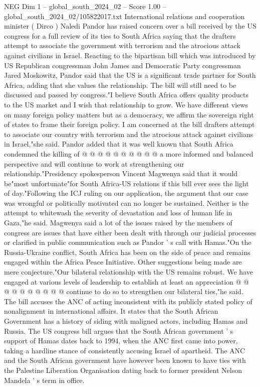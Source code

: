 \begin{textsample}{NEG Dim 1 – global\_south\_2024\_02 – Score 1.00 – global\_south\_2024\_02/105822017.txt}  \label{ex:f1_neg_423}
International relations and cooperation minister ( Dirco ) Naledi Pandor has raised concern over a bill received by the US congress for a full review of its ties to South Africa saying that the drafters attempt to associate the government with terrorism and the atrocious attack against civilians in Israel.
Reacting to the bipartisan bill which was introduced by US Republican congressman John James and Democratic Party congressman Jared Moskowitz, Pandor said that the US is a significant trade partner for South Africa, adding that she values the relationship.
The bill will still need to be discussed and passed by congress."I believe South Africa offers quality products to the US market and I wish that relationship to grow.
We have different views on many foreign policy matters but as a democracy, we affirm the sovereign right of states to frame their foreign policy.
I am concerned at the bill drafters attempt to associate our country with terrorism and the atrocious attack against civilians in Israel,"she said.
Pandor added that it was well known that South Africa condemned the killing of @ @ @ @ @ @ @ @ @ @ a more informed and balanced perspective and will continue to work at strengthening our relationship."Presidency spokesperson Vincent Magwenya said that it would be"most unfortunate"for South Africa-US relations if this bill ever sees the light of day."Following the ICJ ruling on our application, the argument that our case was wrongful or politically motivated can no longer be sustained.
Neither is the attempt to whitewash the severity of devastation and loss of human life in Gaza,"he said.
Magwenya said a lot of the issues raised by the members of congress are issues that have either been dealt with through our judicial processes or clarified in public communication such as Pandor ' s call with Hamas."On the Russia-Ukraine conflict, South Africa has been on the side of peace and remains engaged within the Africa Peace Initiative.
Other suggestions being made are mere conjecture."Our bilateral relationship with the US remains robust.
We have engaged at various levels of leadership to establish at least an appreciation @ @ @ @ @ @ @ @ @ @ continue to do so to strengthen our bilateral ties,"he said.
The bill accuses the ANC of acting inconsistent with its publicly stated policy of nonalignment in international affairs.
It states that the South African Government has a history of siding with maligned actors, including Hamas and Russia.
The US congress bill argues that the South African government ' s support of Hamas dates back to 1994, when the ANC first came into power, taking a hardline stance of consistently accusing Israel of apartheid.
The ANC and the South African government have however been known to have ties with the Palestine Liberation Organisation dating back to former president Nelson Mandela ' s term in office.

\end{textsample}
